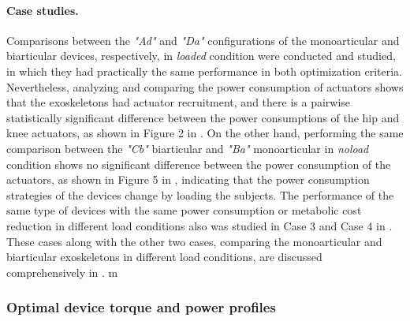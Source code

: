 \documentclass[10pt,letterpaper]{article}
\begin{document}
\paragraph*{Case studies.} Comparisons between the {\it "Ad"} and {\it "Da"} configurations of the monoarticular and biarticular devices, respectively, in {\it loaded} condition were conducted and studied, in which they had practically the same performance in both optimization criteria. Nevertheless, analyzing and comparing the power consumption of actuators shows that the exoskeletons had actuator recruitment, and there is a pairwise statistically significant difference between the power consumptions of the hip and knee actuators, as shown in Figure 2 in . On the other hand, performing the same comparison between the {\it "Cb"} biarticular and {\it "Ba"} monoarticular in {\it noload} condition shows no significant difference between the power consumption of the actuators, as shown in Figure 5 in , indicating that the power consumption strategies of the devices change by loading the subjects. The performance of the same type of devices with the same power consumption or metabolic cost reduction in different load conditions also was studied in Case 3 and Case 4 in . These cases along with the other two cases, comparing the monoarticular and biarticular exoskeletons in different load conditions, are discussed comprehensively in .
m\subsubsection*{Optimal device torque and power profiles }
\end{document}
